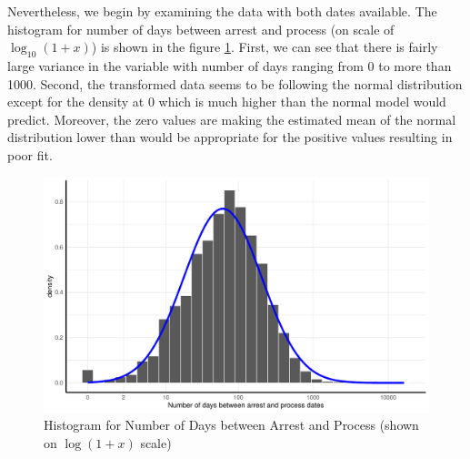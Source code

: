 Nevertheless, we begin by examining the data with both dates available. 
The histogram for number of days between arrest and process (on scale of $\log_{10}(1 + x)$) is shown in the figure \ref{fig:simple_lm_hist}. First, we can see that there is fairly large variance in the variable with   number of days ranging from 0 to more than 1000.  Second, the transformed data seems to be following the normal distribution except for the density at 0
 which is much higher than the normal model would predict. Moreover, the  zero values are making the estimated mean of the normal distribution lower than would be appropriate for the positive values resulting in poor fit. 

 \begin{figure}[h]
\centering
\includegraphics[width=\textwidth]{plots/imputing_arrest_date/simple_lm_hist.pdf}
\caption{Histogram for Number of Days between Arrest and Process (shown on $\log(1 + x)$ scale)}
\label{fig:simple_lm_hist}
\end{figure}

